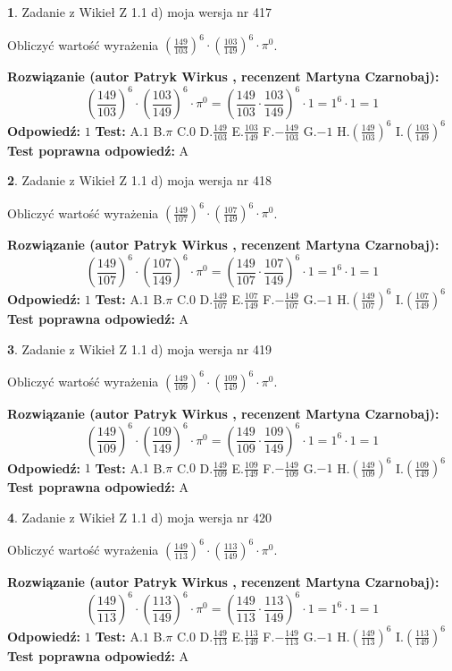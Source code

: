 \documentclass[12pt, a4paper]{article}
\theoremstyle{definition} %
\newtheorem{zad}{}
\newcommand{\zadStart}[1]{\begin{zad}#1\newline}
\newcommand{\zadStop}{\end{zad}}
\newcommand{\rozwStart}[2]{\noindent \textbf{Rozwiązanie (autor #1 , recenzent #2): }\newline}
\newcommand{\rozwStop}{\newline}
\newcommand{\odpStart}{\noindent \textbf{Odpowiedź:}\newline}
\newcommand{\odpStop}{\newline}
\newcommand{\testStart}{\noindent \textbf{Test:}\newline}
\newcommand{\testStop}{\newline}
\newcommand{\kluczStart}{\noindent \textbf{Test poprawna odpowiedź:}\newline}
\newcommand{\kluczStop}{\newline}
\begin{document}
\zadStart{Zadanie z Wikieł Z 1.1 d) moja wersja nr 417}

Obliczyć wartość wyrażenia $(\frac{149}{103})^{6} \cdot (\frac{103}{149})^{6} \cdot \pi^{0}$.
\zadStop
\rozwStart{Patryk Wirkus}{Martyna Czarnobaj}
$$(\frac{149}{103})^{6} \cdot (\frac{103}{149})^{6} \cdot \pi^{0} = (\frac{149}{103} \cdot \frac{103}{149})^{6} \cdot 1 = 1^{6} \cdot 1 = 1$$
\rozwStop
\odpStart
$1$
\odpStop
\testStart
A.$1$ B.$\pi$ C.$0$ D.$\frac{149}{103}$ E.$\frac{103}{149}$
F.$-\frac{149}{103}$ G.$-1$
H.$(\frac{149}{103})^{6}$
I.$(\frac{103}{149})^{6}$
\testStop
\kluczStart
A
\kluczStop



\zadStart{Zadanie z Wikieł Z 1.1 d) moja wersja nr 418}

Obliczyć wartość wyrażenia $(\frac{149}{107})^{6} \cdot (\frac{107}{149})^{6} \cdot \pi^{0}$.
\zadStop
\rozwStart{Patryk Wirkus}{Martyna Czarnobaj}
$$(\frac{149}{107})^{6} \cdot (\frac{107}{149})^{6} \cdot \pi^{0} = (\frac{149}{107} \cdot \frac{107}{149})^{6} \cdot 1 = 1^{6} \cdot 1 = 1$$
\rozwStop
\odpStart
$1$
\odpStop
\testStart
A.$1$ B.$\pi$ C.$0$ D.$\frac{149}{107}$ E.$\frac{107}{149}$
F.$-\frac{149}{107}$ G.$-1$
H.$(\frac{149}{107})^{6}$
I.$(\frac{107}{149})^{6}$
\testStop
\kluczStart
A
\kluczStop



\zadStart{Zadanie z Wikieł Z 1.1 d) moja wersja nr 419}

Obliczyć wartość wyrażenia $(\frac{149}{109})^{6} \cdot (\frac{109}{149})^{6} \cdot \pi^{0}$.
\zadStop
\rozwStart{Patryk Wirkus}{Martyna Czarnobaj}
$$(\frac{149}{109})^{6} \cdot (\frac{109}{149})^{6} \cdot \pi^{0} = (\frac{149}{109} \cdot \frac{109}{149})^{6} \cdot 1 = 1^{6} \cdot 1 = 1$$
\rozwStop
\odpStart
$1$
\odpStop
\testStart
A.$1$ B.$\pi$ C.$0$ D.$\frac{149}{109}$ E.$\frac{109}{149}$
F.$-\frac{149}{109}$ G.$-1$
H.$(\frac{149}{109})^{6}$
I.$(\frac{109}{149})^{6}$
\testStop
\kluczStart
A
\kluczStop



\zadStart{Zadanie z Wikieł Z 1.1 d) moja wersja nr 420}

Obliczyć wartość wyrażenia $(\frac{149}{113})^{6} \cdot (\frac{113}{149})^{6} \cdot \pi^{0}$.
\zadStop
\rozwStart{Patryk Wirkus}{Martyna Czarnobaj}
$$(\frac{149}{113})^{6} \cdot (\frac{113}{149})^{6} \cdot \pi^{0} = (\frac{149}{113} \cdot \frac{113}{149})^{6} \cdot 1 = 1^{6} \cdot 1 = 1$$
\rozwStop
\odpStart
$1$
\odpStop
\testStart
A.$1$ B.$\pi$ C.$0$ D.$\frac{149}{113}$ E.$\frac{113}{149}$
F.$-\frac{149}{113}$ G.$-1$
H.$(\frac{149}{113})^{6}$
I.$(\frac{113}{149})^{6}$
\testStop
\kluczStart
A
\kluczStop
\end{document}
